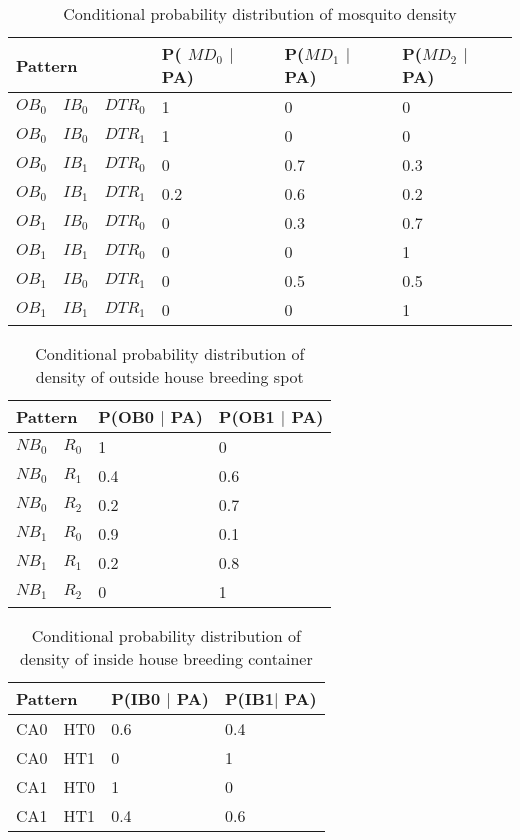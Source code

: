 \documentclass[a4paper,9pt,nil]{article}
\begin{document}
	
	
	\begin{table}[!htbp]
		\centering
		\normalsize
		\begin{tabular}{|l|l|l|l|l|l|}
			\hline
			\multicolumn{3}{|l|}{Pattern}	 & P( $MD_0$ $\mid$ PA) & P($MD_1$ $\mid$ PA) & P($MD_2$  $\mid$ PA)\\
			\hline
			$OB_0$ & $IB_0$ & $DTR_0$ & 1 & 0 & 0\\
			\hline
			$OB_0$ & $IB_0$ & $DTR_1$ & 1 & 0 & 0\\
			\hline
			$OB_0$ & $IB_1$ & $DTR_0$ & 0 & 0.7 & 0.3\\
			\hline
			$OB_0$ & $IB_1$ & $DTR_1$ & 0.2 & 0.6 & 0.2\\
			\hline
			$OB_1$ & $IB_0$ & $DTR_0$ & 0 & 0.3 & 0.7\\
			\hline
			$OB_1$ & $IB_1$ & $DTR_0$ & 0 & 0 & 1\\
			\hline
			$OB_1$ & $IB_0$ & $DTR_1$ & 0 & 0.5 & 0.5\\
			\hline
			$OB_1$ & $IB_1$ & $DTR_1$ & 0 & 0 & 1\\
			\hline
		\end{tabular}
		\caption{ Conditional probability distribution of mosquito density}
	\end{table}
	
	
	\begin{table}[!htbp]
		\centering
		\normalsize
		\begin{tabular}{|l|l|l|l|}
			\hline
			\multicolumn{2}{|l|}{Pattern}  & P(OB0 $\mid$ PA) & P(OB1 $\mid$ PA)\\
			\hline
			$NB_0$ & $R_0$ & 1 & 0\\
			\hline
			$NB_0$ & $R_1$ & 0.4 & 0.6\\
			\hline
			$NB_0$ & $R_2$ & 0.2 & 0.7\\
			\hline
			$NB_1$ & $R_0$ & 0.9 & 0.1\\
			\hline
			$NB_1$ & $R_1$ & 0.2 & 0.8\\
			\hline
			$NB_1$ & $R_2$ & 0 & 1\\
			\hline
		\end{tabular}
		\caption{Conditional probability distribution of density of outside house breeding spot}
	\end{table}
	
	\begin{table}[!htbp]
		\centering
		\normalsize
		\begin{tabular}{|l|l|l|l|}
			\hline
		\multicolumn{2}{|l|}{Pattern}  & P(IB0 $\mid$ PA) & P(IB1$\mid$ PA)\\
			\hline
			CA0 & HT0 & 0.6 & 0.4\\
			\hline
			CA0 & HT1 & 0 & 1\\
			\hline
			CA1 & HT0 & 1 & 0\\
			\hline
			CA1 & HT1 & 0.4 & 0.6\\
			\hline
		\end{tabular}
			\caption{Conditional probability distribution of density of inside house breeding container}
	\end{table}
	
\end{document}
